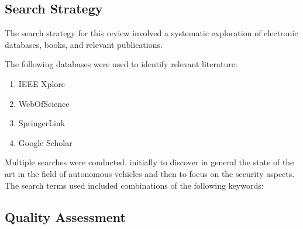 \documentclass{scrartcl}
\begin{document}
    \subsection{Search Strategy}\label{subsec:search-strategy}

    The search strategy for this review involved a systematic exploration of electronic databases, books, and relevant publications.

    The following databases were used to identify relevant literature:

    \begin{enumerate}
        \item IEEE Xplore
        \item WebOfScience
        \item SpringerLink
        \item Google Scholar
    \end{enumerate}

    Multiple searches were conducted, initially to discover in general the state of the art in the field of autonomous vehicles and then to focus on the security aspects.
    The search terms used included combinations of the following keywords:

    \subsection{Quality Assessment}\label{subsec:quality-assessment}

    


    \newpage
    \nocite{*}
    
    
\end{document}
